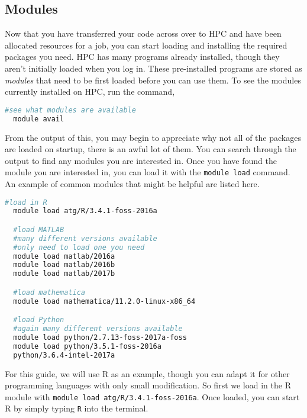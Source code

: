 \subsection{Modules}
Now that you have transferred your code across over to HPC and have been allocated resources for a job, you can start loading and installing the required packages you need. HPC has many programs already installed, though they aren't initially loaded when you log in. These pre-installed programs are stored as \textit{modules} that need to be first loaded before you can use them. To see the modules currently installed on HPC, run the command,
%
%
\begin{lstlisting}[language=bash, frame=single]
  #see what modules are available
  module avail
\end{lstlisting}
From the output of this, you may begin to appreciate why not all of the packages are loaded on startup, there is an awful lot of them. You can search through the output to find any modules you are interested in. Once you have found the module you are interested in, you can load it with the \texttt{module load} command. An example of common modules that might be helpful are listed here.
%
%
\begin{lstlisting}[language=bash, frame=single]
  #load in R
  module load atg/R/3.4.1-foss-2016a

  #load MATLAB
  #many different versions available
  #only need to load one you need
  module load matlab/2016a 
  module load matlab/2016b 
  module load matlab/2017b

  #load mathematica
  module load mathematica/11.2.0-linux-x86_64

  #load Python
  #again many different versions available
  module load python/2.7.13-foss-2017a-foss
  module load python/3.5.1-foss-2016a
  python/3.6.4-intel-2017a
\end{lstlisting}
%
%
%
For this guide, we will use R as an example, though you can adapt it for other programming languages with only small modification. So first we load in the R module with \texttt{module load atg/R/3.4.1-foss-2016a}. Once loaded, you can start R by simply typing \texttt{R} into the terminal.
%
%
%
